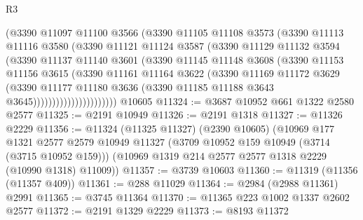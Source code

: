 \begin{lexlean}{R3}
\begin{coremodule}
                        (@3390
                          @11097
                          @11100
                          @3566
                          (@3390
                            @11105
                            @11108
                            @3573
                            (@3390
                              @11113
                              @11116
                              @3580
                              (@3390
                                @11121
                                @11124
                                @3587
                                (@3390
                                  @11129
                                  @11132
                                  @3594
                                  (@3390
                                    @11137
                                    @11140
                                    @3601
                                    (@3390
                                      @11145
                                      @11148
                                      @3608
                                      (@3390
                                        @11153
                                        @11156
                                        @3615
                                        (@3390
                                          @11161
                                          @11164
                                          @3622
                                          (@3390
                                            @11169
                                            @11172
                                            @3629
                                            (@3390
                                              @11177
                                              @11180
                                              @3636
                                              (@3390 @11185 @11188 @3643 @3645))))))))))))))))))))))
    @10605
@11324 := @3687 @10952 @661 @1322 @2580 @2577
@11325 := @2191 @10949
@11326 := @2191 @1318
@11327 := @11326 @2229
@11356 := @11324
    (@11325 @11327)
    (@2390 @10605)
    (@10969
      @177
      @1321
      @2577
      @2579
      @10949
      @11327
      (@3709 @10952 @159 @10949 (@3714 (@3715 @10952 @159)))
      (@10969 @1319 @214 @2577 @2577 @1318 @2229 (@10990 @1318) @11009))
@11357 := @3739 @10603
@11360 := @11319 (@11356 (@11357 @409))
@11361 := @288 @11029
@11364 := @2984 (@2988 @11361) @2991
@11365 := @3745 @11364
@11370 := @11365 @223 @1002 @1337 @2602 @2577
@11372 := @2191 @1329 @2229
@11373 := @8193 @11372

\end{coremodule}
\end{lexlean}
